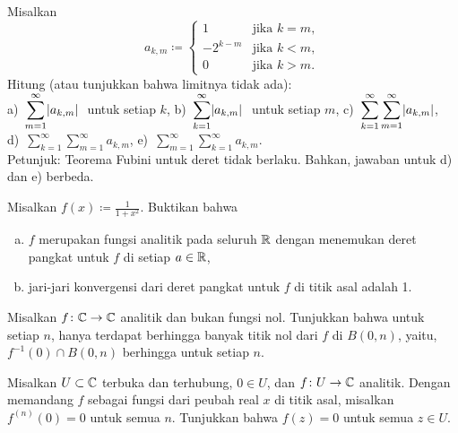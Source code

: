 \begin{exercise}
Misalkan
\begin{equation*}
a_{k,m} \coloneqq
\begin{cases}
1        & \text{jika } k=m,\\
-2^{k-m} & \text{jika } k<m,\\
0        & \text{jika } k>m.
\end{cases}
\end{equation*}
Hitung (atau tunjukkan bahwa limitnya tidak ada):
\\
a)~$\displaystyle \sum_{m=1}^\infty \lvert {a_{k,m}} \rvert~$ untuk setiap $k$,
\hspace{\fill}
b)~$\displaystyle \sum_{k=1}^\infty \lvert {a_{k,m}} \rvert~$ untuk setiap $m$,
\hspace{\fill}
c)~$\displaystyle \sum_{k=1}^\infty \sum_{m=1}^\infty \lvert {a_{k,m}} \rvert$,
\hspace{\fill}
d)~$\displaystyle \sum_{k=1}^\infty \sum_{m=1}^\infty a_{k,m}$,
\hspace{\fill}
e)~$\displaystyle \sum_{m=1}^\infty \sum_{k=1}^\infty a_{k,m}$.
\\
Petunjuk: Teorema Fubini untuk deret tidak berlaku.
Bahkan, jawaban untuk d) dan e) berbeda.
\end{exercise}

\begin{exercise}
\pagebreak[2]
Misalkan $f(x) \coloneqq \frac{1}{1+x^2}$.  Buktikan bahwa
\begin{enumerate}[a)]
\item
$f$ merupakan fungsi analitik pada seluruh ${\mathbb{R}}$
dengan menemukan deret pangkat untuk $f$ di setiap $a \in {\mathbb{R}}$,
\item
jari-jari konvergensi dari
deret pangkat untuk $f$ di titik asal adalah 1.
\end{enumerate}
\end{exercise}


\begin{exercise}
\pagebreak[2]
Misalkan $f \colon {\mathbb{C}} \to {\mathbb{C}}$ analitik dan bukan fungsi nol.  Tunjukkan bahwa untuk setiap
$n$, hanya terdapat berhingga banyak titik nol dari $f$ di $B(0,n)$, yaitu,
$f^{-1}(0) \cap B(0,n)$ berhingga untuk setiap $n$.
\end{exercise}

\begin{exercise}
Misalkan $U \subset {\mathbb{C}}$ terbuka dan terhubung, $0 \in U$, dan $f \colon U
\to {\mathbb{C}}$ analitik.  Dengan memandang $f$ sebagai fungsi dari peubah real $x$
di titik asal, misalkan $f^{(n)}(0) = 0$ untuk semua $n$.  Tunjukkan bahwa $f(z) = 0$
untuk semua $z \in U$.
\end{exercise}

